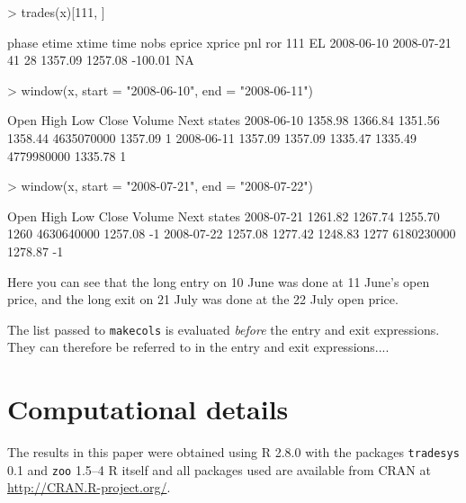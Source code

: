\documentclass[a4]{article}
\newcommand{\code}[1]{\texttt{#1}}
\begin{document}
\begin{Schunk}
\begin{Sinput}
> trades(x)[111, ]
\end{Sinput}
\begin{Soutput}
    phase      etime      xtime time nobs  eprice  xprice     pnl ror
111    EL 2008-06-10 2008-07-21   41   28 1357.09 1257.08 -100.01  NA
\end{Soutput}
\begin{Sinput}
> window(x, start = "2008-06-10", end = "2008-06-11")
\end{Sinput}
\begin{Soutput}
              Open    High     Low   Close     Volume    Next states
2008-06-10 1358.98 1366.84 1351.56 1358.44 4635070000 1357.09      1
2008-06-11 1357.09 1357.09 1335.47 1335.49 4779980000 1335.78      1
\end{Soutput}
\begin{Sinput}
> window(x, start = "2008-07-21", end = "2008-07-22")
\end{Sinput}
\begin{Soutput}
              Open    High     Low Close     Volume    Next states
2008-07-21 1261.82 1267.74 1255.70  1260 4630640000 1257.08     -1
2008-07-22 1257.08 1277.42 1248.83  1277 6180230000 1278.87     -1
\end{Soutput}
\end{Schunk}
Here you can see that the long entry on 10 June was done at 11 June's
open price, and the long exit on 21 July was done at the 22 July open price.

The list passed to \code{makecols} is evaluated \emph{before} the
entry and exit expressions. They can therefore be referred to in the
entry and exit expressions....

\section*{Computational details}
The results in this paper were obtained using R
2.8.0 with the packages
\code{tradesys} 0.1 
and \code{zoo}  1.5--4 R itself
and all packages used are available from CRAN at
\url{http://CRAN.R-project.org/}.
\end{document}
